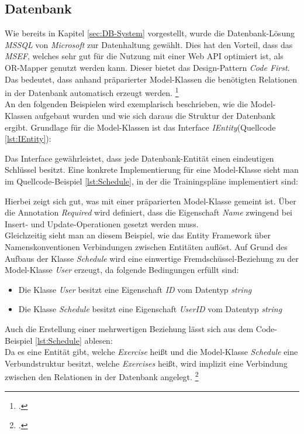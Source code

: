 \subsection{Datenbank}
\label{ssec:aufbau-server-db}
Wie bereits in Kapitel \ref{sec:DB-System} vorgestellt, wurde die Datenbank-Lösung \textit{\ac{MSSQL}} von \textit{Microsoft} zur Datenhaltung gewählt. Dies hat den Vorteil, dass das \textit{\gls{MSEF}}, welches sehr gut für die Nutzung mit einer Web \ac{API} optimiert ist, als \gls{OR-Mapper} genutzt werden kann. Dieser bietet das Design-Pattern \textit{Code First}. Das bedeutet, dass anhand präparierter Model-Klassen die benötigten Relationen in der Datenbank automatisch erzeugt werden. \footcite{entity-framework-code-first}\\
An den folgenden Beispielen wird exemplarisch beschrieben, wie die Model-Klassen aufgebaut wurden und wie sich daraus die Struktur der Datenbank ergibt. Grundlage für die Model-Klassen ist das Interface \textit{IEntity}(Quellcode \ref{lst:IEntity}):

Das Interface gewährleistet, dass jede Datenbank-Entität einen eindeutigen Schlüssel besitzt.
Eine konkrete Implementierung für eine Model-Klasse sieht man im \linebreak Quellcode-Beispiel \ref{lst:Schedule}, in der die Trainingspläne implementiert sind:

Hierbei zeigt sich gut, was mit einer präparierten Model-Klasse gemeint ist. Über die Annotation \textit{Required} wird definiert, dass die Eigenschaft \textit{Name} zwingend bei Insert- und Update-Operationen gesetzt werden muss. \\
Gleichzeitig sieht man an diesem Beispiel, wie das Entity Framework über Namenskonventionen Verbindungen zwischen Entitäten auflöst. Auf Grund des Aufbaus der Klasse \textit{Schedule} wird eine einwertige Fremdschüssel-Beziehung zu der Model-Klasse \textit{User} erzeugt, da folgende Bedingungen erfüllt sind:
\begin{itemize}
\item Die Klasse \textit{User} besitzt eine Eigenschaft \textit{ID} vom Datentyp \textit{string}
\item Die Klasse \textit{Schedule} besitzt eine Eigenschaft \textit{UserID} vom Datentyp \textit{string}
\end{itemize}
Auch die Erstellung einer mehrwertigen Beziehung lässt sich aus dem Code-Beispiel \ref{lst:Schedule} ablesen: \\
Da es eine Entität gibt, welche \textit{Exercise} heißt und die Model-Klasse \textit{Schedule} eine Verbundstruktur besitzt, welche \textit{Exercises} heißt, wird implizit eine Verbindung zwischen den Relationen in der Datenbank angelegt. \footcite{entity-framework-code-first}

